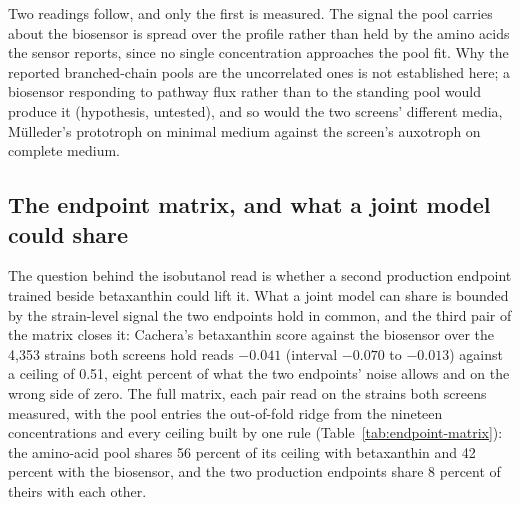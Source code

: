 Two readings follow, and only the first is measured. The signal the pool carries about
the biosensor is spread over the profile rather than held by the amino acids the sensor
reports, since no single concentration approaches the pool fit. Why the reported
branched-chain pools are the uncorrelated ones is not established here; a biosensor
responding to pathway flux rather than to the standing pool would produce it
(hypothesis, untested), and so would the two screens' different media, M\"ulleder's
prototroph on minimal medium against the screen's auxotroph on complete medium.


\subsection{The endpoint matrix, and what a joint model could share}
\label{sec:endpoint-matrix}

The question behind the isobutanol read is whether a second production endpoint trained
beside betaxanthin could lift it. What a joint model can share is bounded by the
strain-level signal the two endpoints hold in common, and the third pair of the matrix
closes it: Cachera's betaxanthin score against the biosensor over the 4,353 strains both
screens hold reads $-0.041$ (interval $-0.070$ to $-0.013$) against a ceiling of 0.51,
eight percent of what the two endpoints' noise allows and on the wrong side of zero.
The full matrix, each pair read on the strains both screens measured, with the pool
entries the out-of-fold ridge from the nineteen concentrations and every ceiling
built by one rule (Table~\ref{tab:endpoint-matrix}): the amino-acid pool shares 56
percent of its ceiling with betaxanthin and 42 percent with the biosensor, and the two
production endpoints share 8 percent of theirs with each other.

